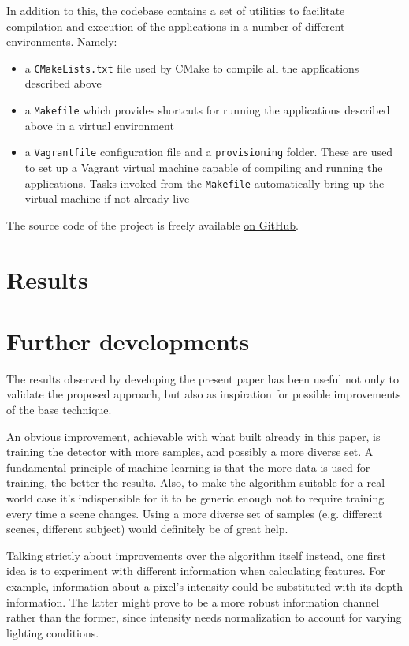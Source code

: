 \documentclass[a4paper,11pt,titlepage]{article}
\begin{document}
In addition to this, the codebase contains a set of utilities to facilitate
compilation and execution of the applications in a number of different
environments. Namely:

\begin{itemize}
  \item a \texttt{CMakeLists.txt} file used by CMake to compile all the
    applications described above
  \item a \texttt{Makefile} which provides shortcuts for running the
    applications described above in a virtual environment
  \item a \texttt{Vagrantfile} configuration file and a \texttt{provisioning}
    folder. These are used to set up a Vagrant virtual machine capable of
    compiling and running the applications. Tasks invoked from the
    \texttt{Makefile} automatically bring up the virtual machine if not already
    live
\end{itemize}

The source code of the project is freely available
\href{https://github.com/stefanozanella/people_detection}{on GitHub}.

\section{Results}

\section{Further developments}
The results observed by developing the present paper has been useful not only to
validate the proposed approach, but also as inspiration for possible
improvements of the base technique.

An obvious improvement, achievable with what built already in this paper, is
training the detector with more samples, and possibly a more diverse set. A
fundamental principle of machine learning is that the more data is used for
training, the better the results. Also, to make the algorithm suitable for a
real-world case it's indispensible for it to be generic enough not to require
training every time a scene changes. Using a more diverse set of samples (e.g.
different scenes, different subject) would definitely be of great help.

Talking strictly about improvements over the algorithm itself instead, one first
idea is to experiment with different information when calculating features. For
example, information about a pixel's intensity could be substituted with its
depth information. The latter might prove to be a more robust information
channel rather than the former, since intensity needs normalization to account
for varying lighting conditions.
\end{document}
